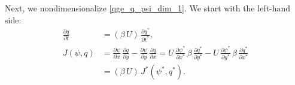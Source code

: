 Next, we nondimensionalize \eqref{qge_q_psi_dim_1}. We start with the left-hand
side:
\begin{align}
  \frac{\partial q}{\partial t} &= ( \beta \, U) \, \frac{\partial q^*}{\partial t^*} ,
    \label{eqn:qge_q_psi_nondim_5} \\[0.2cm]
  J(\psi,q) &=  \frac{\partial \psi}{\partial x} \, \frac{\partial q}{\partial y} - \frac{\partial
    \psi}{\partial y} \, \frac{\partial q}{\partial x}
    = U \, \frac{\partial \psi^*}{\partial x^*} \, \beta \, \frac{\partial q^*}{\partial y^*} - U \,
      \frac{\partial \psi^*}{\partial y^*} \,  \beta \, \frac{\partial q^*}{\partial x^*}
      \nonumber \\[0.2cm]
  &= (  \beta \, U ) \, J^*(\psi^*,q^*) .
  \label{eqn:qge_q_psi_nondim_6}
\end{align}

